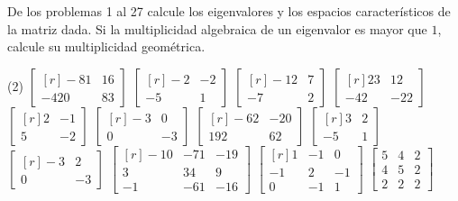 \noindent
De los problemas 1 al 27 calcule los eigenvalores y los espacios característicos de la matriz dada. Si la multiplicidad algebraica de un eigenvalor es mayor que $1$, calcule su multiplicidad geométrica.
\begin{tasks}[
    style=enumerate,
    label-offset = 3mm,
    ](2)
    \task $\begin{bmatrix*}[r]-81 & 16 \\ -420 & 83\end{bmatrix*}$
    \task $\begin{bmatrix*}[r]-2 & -2 \\ -5 & 1\end{bmatrix*}$
    \task $\begin{bmatrix*}[r]-12 & 7 \\ -7 & 2\end{bmatrix*}$
    \task $\begin{bmatrix*}[r]23 & 12 \\ -42 & -22\end{bmatrix*}$
    \task $\begin{bmatrix*}[r]2 & -1 \\ 5 & -2\end{bmatrix*}$
    \task $\begin{bmatrix*}[r]-3 & 0 \\ 0 & -3\end{bmatrix*}$
    \task $\begin{bmatrix*}[r]-62 & -20 \\ 192 & 62\end{bmatrix*}$
    \task $\begin{bmatrix*}[r]3 & 2 \\ -5 & 1\end{bmatrix*}$
    \task $\begin{bmatrix*}[r]-3 & 2 \\ 0 & -3\end{bmatrix*}$
    \task $\begin{bmatrix*}[r]-10 & -71 & -19 \\ 3 & 34 & 9 \\ -1 & -61 & -16\end{bmatrix*}$
    \task $\begin{bmatrix*}[r]1 & -1 & 0 \\ -1 & 2 & -1 \\ 0 & -1 & 1\end{bmatrix*}$
    \task $\begin{bmatrix*}5 & 4 & 2 \\ 4 & 5 & 2 \\ 2 & 2 & 2\end{bmatrix*}$

\end{tasks}
